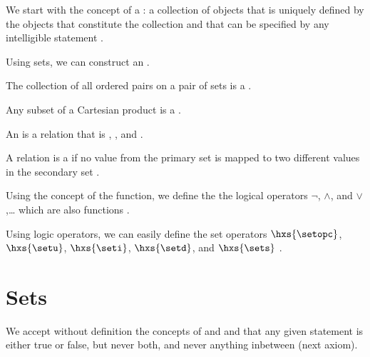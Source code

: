 \begin{liste}
  \item We start with the concept of a : a collection of objects
        that is uniquely defined by the objects that constitute the collection
        and that can be specified by any intelligible statement .        
  \item Using sets, we can construct an  .
  \item The collection of all ordered pairs on a pair of sets
        is a  .
  \item Any subset of a Cartesian product is a  .
  \item An  is a relation that is 
        , , and  .
  \item A relation is a  if 
        no value from the primary set is mapped to 
        two different values in the secondary set .
  \item Using the concept of the function, we define the the logical operators 
         $\lnot$,  $\land$, and  $\lor$,\ldots
        which are also functions .
  \item Using logic operators, we can easily define the set operators
         $\hxs{\setopc}$,  $\hxs{\setu}$,  $\hxs{\seti}$,
         $\hxs{\setd}$, and  $\hxs{\sets}$ .
\end{liste}

\section{Sets}
We accept without definition the concepts of  and 
and that any given statement is either true or false, but never both,
and never anything inbetween (next axiom).
\begin{axiom}
\label{ax:plogic}
\end{axiom}

